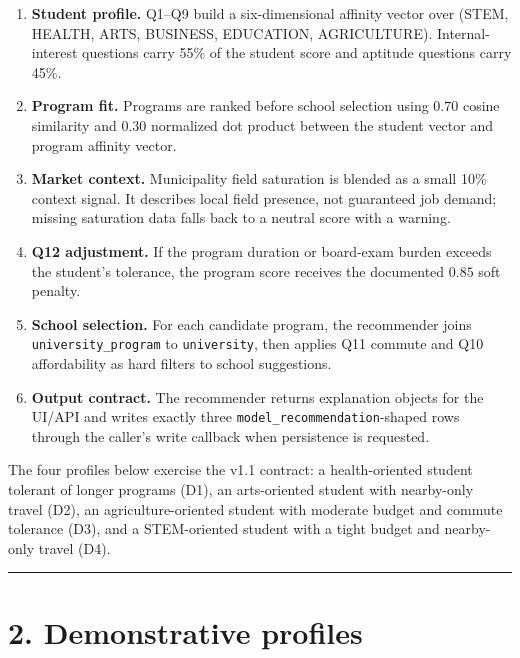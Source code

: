\documentclass[11pt,a4paper]{article}
\begin{document}
\begin{enumerate}\setlength\itemsep{0.15em}
  \item \textbf{Student profile.} Q1--Q9 build a six-dimensional
        affinity vector over (STEM, HEALTH, ARTS, BUSINESS, EDUCATION,
        AGRICULTURE). Internal-interest questions carry 55\% of the
        student score and aptitude questions carry 45\%.
  \item \textbf{Program fit.} Programs are ranked before school
        selection using $0.70$ cosine similarity and $0.30$ normalized
        dot product between the student vector and program affinity
        vector.
  \item \textbf{Market context.} Municipality field saturation is blended
        as a small 10\% context signal. It describes local field presence,
        not guaranteed job demand; missing saturation data falls back to a
        neutral score with a warning.
  \item \textbf{Q12 adjustment.} If the program duration or board-exam
        burden exceeds the student's tolerance, the program score receives
        the documented $0.85$ soft penalty.
  \item \textbf{School selection.} For each candidate program, the
        recommender joins \texttt{university\_program} to
        \texttt{university}, then applies Q11 commute and Q10 affordability
        as hard filters to school suggestions.
  \item \textbf{Output contract.} The recommender returns explanation
        objects for the UI/API and writes exactly three
        \texttt{model\_recommendation}-shaped rows through the caller's
        write callback when persistence is requested.
\end{enumerate}

\noindent
The four profiles below exercise the v1.1 contract: a health-oriented
student tolerant of longer programs (D1), an arts-oriented student with
nearby-only travel (D2), an agriculture-oriented student with moderate
budget and commute tolerance (D3), and a STEM-oriented student with a tight
budget and nearby-only travel (D4).

\vspace{0.5em}
\hrule
\vspace{0.5em}

\section*{2. Demonstrative profiles}
\end{document}
